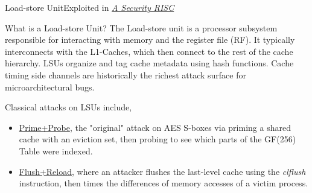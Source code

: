 \begin{frame}{Load-store Unit}{Exploited in \href{https://publications.cispa.saarland/3924/1/security_risc.pdf}{\color{pink}\textit{A Security RISC}}}
    \begin{block}{What is a Load-store Unit?}
        The Load-store unit is a processor subsystem responsible for interacting with memory and the register file (RF). It typically interconnects with the L1-Caches, which then connect to the rest of the cache hierarchy. LSUs organize and tag cache metadata using hash functions. Cache timing side channels are historically the richest attack surface for microarchitectural bugs.
    \end{block}
    Classical attacks on LSUs include, 
    \begin{itemize}
        \item \href{https://eprint.iacr.org/2005/271.pdf}{\color{pink}Prime+Probe}, the "original" attack on AES S-boxes via priming a shared cache with an eviction set, then probing to see which parts of the GF(256) Table were indexed.
        \item \href{https://www.usenix.org/system/files/conference/usenixsecurity14/sec14-paper-yarom.pdf}{\color{pink}Flush+Reload}, where an attacker flushes the last-level cache using the \textit{clflush} instruction, then times the differences of memory accesses of a victim process. 
    \end{itemize}
\end{frame}


